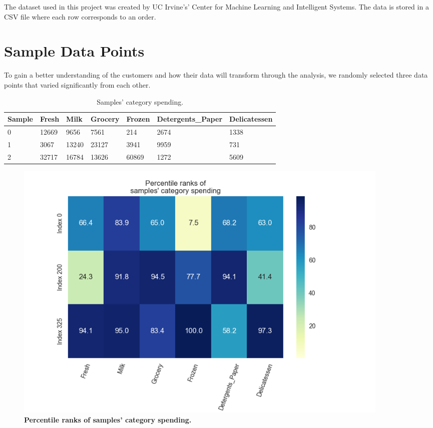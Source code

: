 \documentclass[twoside,openright,titlepage,numbers=noenddot,headinclude,%
               footinclude=true,cleardoublepage=empty,abstractoff,BCOR=5mm,%
               paper=a4,fontsize=11pt,ngerman,american]{scrreprt}
\numberwithin{theorem}{chapter}
\numberwithin{definition}{chapter}
\numberwithin{algorithm}{chapter}
\numberwithin{figure}{chapter}
\numberwithin{table}{chapter}
\numberwithin{equation}{chapter}
\begin{document}
The dataset used in this project was created by UC Irvine's' Center for Machine Learning and Intelligent Systems. The data is stored in a CSV file where each row corresponds to an order.

\section*{Sample Data Points}
To gain a better understanding of the customers and how their data will transform through the analysis, we randomly selected three data points that varied significantly from each other. 

\begin{table}[!htbp]
  \begin{center}
  \caption{Samples' category spending.}
    \begin{tabular}{ |l|l|l|l|l|l|l| } 
    \hline
    Sample & Fresh & Milk & Grocery & Frozen & Detergents\_Paper & Delicatessen\\[1ex]

    \hline
    
      0 &12669 &9656  &7561  &214   &2674  &1338 \\
      1 &3067  &13240 &23127 &3941  &9959  &731  \\
      2 &32717 &16784 &13626 &60869 &1272  &5609 \\
    \hline
    \end{tabular}
  \end{center}
\end{table}

\begin{figure}[!hbtp]
\centering
    \includegraphics[width=0.9\textwidth]{figures/percentileRanksSampleSpending}
    
    
    \caption{\textbf{Percentile ranks of samples' category spending. }}\label{percentileRanksSampleSpending}
\end{figure}
\end{document}
